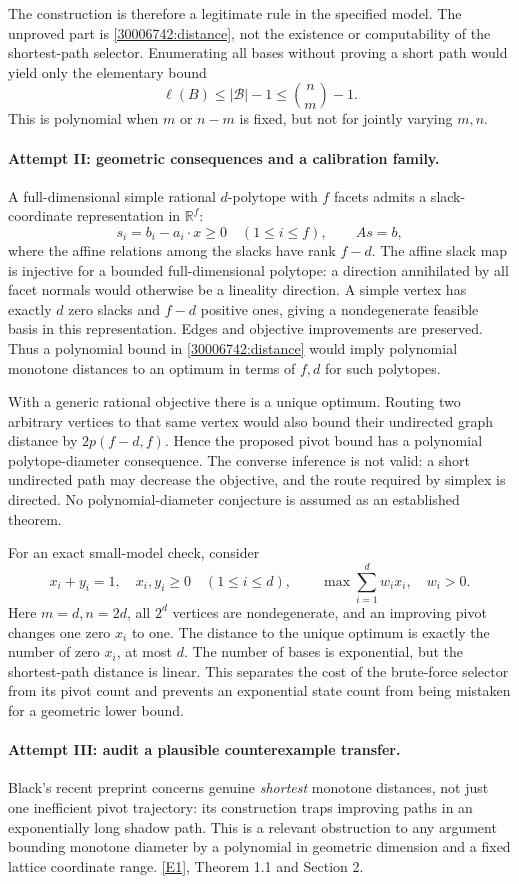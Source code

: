 \documentclass[11pt,a4paper]{article}
\newcommand{\R}{\mathbb{R}}
\newcommand{\eref}[2]{\hyperlink{extra:#1:#2}{[E#2]}}
\numberwithin{equation}{section}
\begin{document}
The construction is therefore a legitimate rule in the specified
model.  The unproved part is \eqref{30006742:distance}, not the existence
or computability of the shortest-path selector.  Enumerating all bases
without proving a short path would yield only the elementary bound
\[
 \ell(B)\leq|\mathcal B|-1\leq\binom nm-1.
\]
This is polynomial when $m$ or $n-m$ is fixed, but not for jointly
varying $m,n$.

\paragraph{Attempt II: geometric consequences and a calibration family.}
A full-dimensional simple rational $d$-polytope with $f$ facets admits
a slack-coordinate representation in $\R^f$:
\[
 s_i=b_i-a_i\cdot x\geq0\quad(1\leq i\leq f),\qquad As=b,
\]
where the affine relations among the slacks have rank $f-d$.
The affine slack map is injective for a bounded full-dimensional
polytope: a direction annihilated by all facet normals would otherwise
be a lineality direction.  A simple vertex has exactly $d$ zero slacks
and $f-d$ positive ones, giving a nondegenerate feasible basis in this
representation.  Edges and objective improvements are preserved.
Thus a polynomial bound in \eqref{30006742:distance} would imply polynomial
monotone distances to an optimum in terms of $f,d$ for such polytopes.

With a generic rational objective there is a unique optimum.  Routing
two arbitrary vertices to that same vertex would also bound their
undirected graph distance by $2p(f-d,f)$.  Hence the proposed pivot
bound has a polynomial polytope-diameter consequence.  The converse
inference is not valid: a short undirected path may decrease the
objective, and the route required by simplex is directed.  No
polynomial-diameter conjecture is assumed as an established theorem.

For an exact small-model check, consider
\[
 x_i+y_i=1,\quad x_i,y_i\geq0\quad(1\leq i\leq d),\qquad
 \max\sum_{i=1}^d w_i x_i,\quad w_i>0.
\]
Here $m=d,n=2d$, all $2^d$ vertices are nondegenerate, and an improving
pivot changes one zero $x_i$ to one.  The distance to the unique
optimum is exactly the number of zero $x_i$, at most $d$.  The number
of bases is exponential, but the shortest-path distance is linear.
This separates the cost of the brute-force selector from its pivot
count and prevents an exponential state count from being mistaken
for a geometric lower bound.

\paragraph{Attempt III: audit a plausible counterexample transfer.}
Black's recent preprint concerns genuine \emph{shortest} monotone
distances, not just one inefficient pivot trajectory: its construction
traps improving paths in an exponentially long shadow path.  This is
a relevant obstruction to any argument bounding monotone diameter by
a polynomial in geometric dimension and a fixed lattice coordinate
range. \eref{30006742}{1}, Theorem 1.1 and Section 2.
\end{document}
